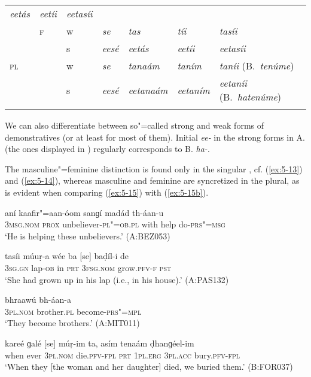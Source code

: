 \begin{table}[htp]
\begin{tabularx}{\textwidth}{ l l l Q Q Q P{23mm} }
\textit{eetás} &
\textit{eetíi} &
\textit{eetasíi} \\
&
\textsc{f} &
w &
\textit{se} &
\textit{tas} &
\textit{tíi} &
\textit{tasíi} \\
&
&
s &
\textit{eesé} &
\textit{eetás} &
\textit{eetíi} &
\textit{eetasíi} \\
\textsc{pl} &
&
w &
\textit{se} &
\textit{tanaám} &
\textit{taním} &
\textit{taníi} (B.~\textit{tenúme})\\
&
&
s &
\textit{eesé} &
\textit{eetanaám} &
\textit{eetaním} &
\textit{eetaníi} (B.~\textit{hatenúme})\\\lspbottomrule
\end{tabularx}
\label{tab:5-4}
\end{table}

We can also differentiate between so"=called strong and weak forms of demonstratives (or at least for most of them). Initial \textit{ee-} in the strong forms in A. (the ones displayed in ) regularly corresponds to B. \textit{ha-}. 

The masculine"=feminine  distinction is found only in the singular , cf. (\ref{ex:5-13}) and (\ref{ex:5-14}), whereas masculine and feminine are syncretized in the plural, as is evident when comparing (\ref{ex:5-15}) with (\ref{ex:5-15b}). 


\begin{exe}
\ex
\label{ex:5-13}
\gll [so] aní kaafir"=aan-óom sanɡí madád th-áan-u \\
\textsc{3msg}.\textsc{nom} \textsc{prox} unbeliever-\textsc{pl"=ob.pl} with help do-\textsc{prs"=msg}\\
\glt `He is helping these unbelievers.' (A:BEZ053)

\ex
\label{ex:5-14}
\gll tasíi múuṛ-a wée ba [se] baḍíl-i de \\
\textsc{3sg}.\textsc{gn} lap-\textsc{ob} in \textsc{prt} \textsc{3fsg}.\textsc{nom}
grow.\textsc{pfv-f} \textsc{pst}\\
\glt `She had grown up in his lap (i.e., in his house).' (A:PAS132)

\ex
\label{ex:5-15}
\gll [se] bhraawú bh-áan-a\\
\textsc{3pl}.\textsc{nom} brother.\textsc{pl} become-\textsc{prs"=mpl}\\
\glt `They become brothers.' (A:MIT011)

\ex
\label{ex:5-15b}
\gll kareé ɡalé [se] múṛ-im ta, asím  tenaám ḍhanɡéel-im\\
when ever \textsc{3pl.nom} die.\textsc{pfv}-\textsc{fpl} \textsc{prt} \textsc{1pl.erg} \textsc{3pl.acc} bury.\textsc{pfv}-\textsc{fpl} \\
\glt `When they [the woman and her daughter] died, we buried them.' (B:FOR037)
\end{exe}

